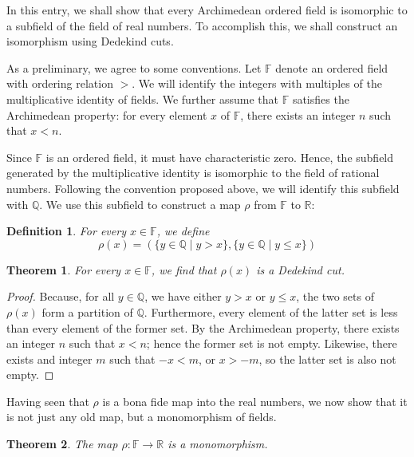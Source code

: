 \documentclass[12pt]{article}
\newtheorem{dfn}{Definition}
\newtheorem{thm}{Theorem}
\begin{document}
In this entry, we shall show that every Archimedean ordered field is isomorphic to
a subfield of the field of real numbers.  To accomplish this, we shall construct an
isomorphism using Dedekind cuts.

As a preliminary, we agree to some conventions.  Let $\mathbb{F}$ denote an ordered
field with ordering relation $>$.  We will identify the integers with multiples of
the multiplicative identity of fields.  We further assume that $\mathbb{F}$ satisfies 
the Archimedean property: for every element $x$ of $\mathbb{F}$, there exists an 
integer $n$ such that $x < n$.

Since $\mathbb{F}$ is an ordered field, it must have characteristic zero.  Hence,
the subfield generated by the multiplicative identity is isomorphic to the field
of rational numbers.  Following the convention proposed above, we will identify
this subfield with $\mathbb{Q}$.  We use this subfield to construct a map $\rho$
from $\mathbb{F}$ to $\mathbb{R}$:

\begin{dfn}
For every $x \in \mathbb{F}$, we define
\[
\rho (x) = 
\left(
      \{y \in \mathbb{Q} \mid y > x \} , 
      \{y \in \mathbb{Q} \mid y \le x \}
\right)
\]
\end{dfn}

\begin{thm}
For every $x \in \mathbb{F}$, we find that $\rho (x)$ is a Dedekind cut.
\end{thm}

\begin{proof}
Because, for all $y \in \mathbb{Q}$, we have either $y > x$ or $y \le x$, the two
sets of $\rho (x)$ form a partition of $\mathbb{Q}$.  Furthermore, every element
of the latter set is less than every element of the former set.  By the Archimedean
property, there exists an integer $n$ such that $x < n$; hence the former set is
not empty.  Likewise, there exists and integer $m$ such that $-x < m$, or $x > -m$, 
so the latter set is also not empty.
\end{proof}

Having seen that $\rho$ is a bona fide map into the real numbers, we now show that
it is not just any old map, but a monomorphism of fields.

\begin{thm}
The map $\rho \colon \mathbb{F} \to \mathbb{R}$ is a monomorphism.
\end{thm}
\end{document}
